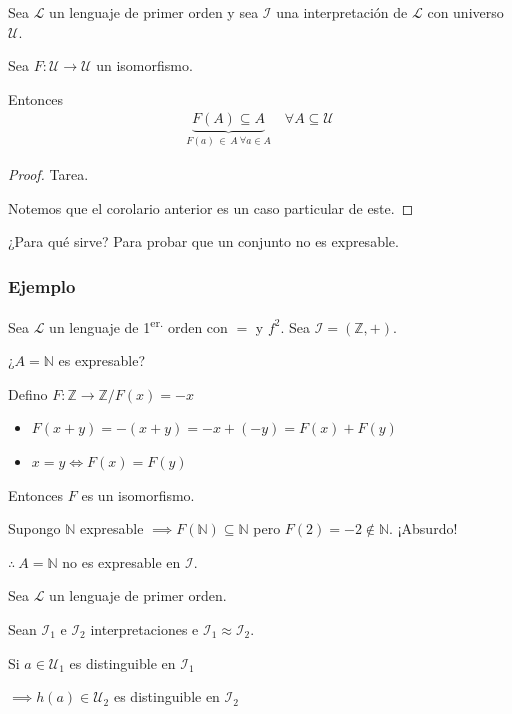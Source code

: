 \bigskip

\begin{corolario}{}{}
    Sea $\mathcal{L}$ un lenguaje de primer orden y sea $\mathcal{I}$ una
    interpretación de $\mathcal{L}$ con universo $\mathcal{U}$.

    Sea $F: \mathcal{U} \to \mathcal{U}$ un isomorfismo.

    \medskip

    Entonces
    \begin{gather*}
        \underbrace{F(A) \subseteq A}_{F(a) \, \in \, A ~ \forall a \in A}
        \quad \forall A \subseteq \mathcal{U}
    \end{gather*}
\end{corolario}

\begin{proof} \phantom{.}
    Tarea.

    Notemos que el corolario anterior es un caso particular de este.
\end{proof}

¿Para qué sirve? Para probar que un conjunto no es expresable.

\subsubsection{Ejemplo}

Sea $\mathcal{L}$ un lenguaje de 1\textsuperscript{er.} orden con $=$ y $f^2$.
Sea $\mathcal{I} = (\mathbb{Z}, +)$.

¿$A = \mathbb{N}$ es expresable?

%
Defino $F: \mathbb{Z} \to \mathbb{Z} / F(x) = -x$
\begin{itemize}
    \item $F(x+y) = -(x+y) = -x + (-y) = F(x) + F(y)$
    \item $x = y \iff F(x) = F(y)$
\end{itemize}

Entonces $F$ es un isomorfismo.

Supongo $\mathbb{N}$ expresable $\implies F(\mathbb{N}) \subseteq \mathbb{N}$
pero $F(2) = -2 \notin \mathbb{N}$.
¡Absurdo!

\begin{center}
    $\therefore ~ A = \mathbb{N}$ no es expresable en $\mathcal{I}$.
\end{center}



\begin{corolario}{}{}
    Sea $\mathcal{L}$ un lenguaje de primer orden. 

    Sean $\mathcal{I}_1$ e $\mathcal{I}_2$ interpretaciones
     e $\mathcal{I}_1 \approx \mathcal{I}_2$.

    \medskip

    Si $a \in \mathcal{U}_1$ es distinguible en $\mathcal{I}_1$
    \begin{center}
        $\implies h(a) \in \mathcal{U}_2$ es distinguible en $\mathcal{I}_2$
    \end{center}
\end{corolario}

